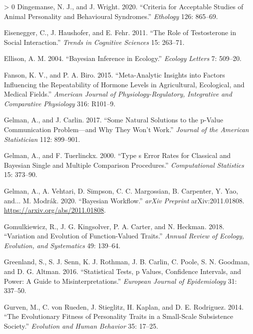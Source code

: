 \documentclass{article}
\newlength{\cslhangindent}
\newenvironment{CSLReferences}[3] %
 {%
  \setlength{\parindent}{0pt}
  \ifodd #1 \everypar{\setlength{\hangindent}{\cslhangindent}}\ignorespaces\fi
  \ifnum #2 > 0
  \setlength{\parskip}{#2\baselineskip}
  \fi
 }%
 {}
\begin{document}
\begin{CSLReferences}{1}{0}
\leavevmode\hypertarget{ref-Ding2020}{}%
Dingemanse, N. J., and J. Wright. 2020. {``Criteria for Acceptable
Studies of Animal Personality and Behavioural Syndromes.''}
\emph{Ethology} 126: 865--69.

\leavevmode\hypertarget{ref-Eis2011}{}%
Eisenegger, C., J. Haushofer, and E. Fehr. 2011. {``The Role of
Testosterone in Social Interaction.''} \emph{Trends in Cognitive
Sciences} 15: 263--71.

\leavevmode\hypertarget{ref-Ellison2004}{}%
Ellison, A. M. 2004. {``Bayesian Inference in Ecology.''} \emph{Ecology
Letters} 7: 509--20.

\leavevmode\hypertarget{ref-Fanson2019}{}%
Fanson, K. V., and P. A. Biro. 2015. {``Meta-Analytic Insights into
Factors Influencing the Repeatability of Hormone Levels in Agricultural,
Ecological, and Medical Fields.''} \emph{American Journal of
Physiology-Regulatory, Integrative and Comparative Physiology} 316:
R101--9.

\leavevmode\hypertarget{ref-Gelman2017}{}%
Gelman, A., and J. Carlin. 2017. {``Some Natural Solutions to the
p-Value Communication Problem---and Why They Won't Work.''}
\emph{Journal of the American Statistician} 112: 899--901.

\leavevmode\hypertarget{ref-Gelman2000}{}%
Gelman, A., and F. Tuerlinckx. 2000. {``Type s Error Rates for Classical
and Bayesian Single and Multiple Comparison Procedures.''}
\emph{Computational Statistics} 15: 373--90.

\leavevmode\hypertarget{ref-Gelman2020}{}%
Gelman, A., A. Vehtari, D. Simpson, C. C. Margossian, B. Carpenter, Y.
Yao, and... M. Modrák. 2020. {``Bayesian Workflow.''} \emph{arXiv
Preprint} arXiv:2011.01808. \url{https://arxiv.org/abs/2011.01808}.

\leavevmode\hypertarget{ref-Gomulk2018}{}%
Gomulkiewicz, R., J. G. Kingsolver, P. A. Carter, and N. Heckman. 2018.
{``Variation and Evolution of Function-Valued Traits.''} \emph{Annual
Review of Ecology, Evolution, and Systematics} 49: 139--64.

\leavevmode\hypertarget{ref-Green2016}{}%
Greenland, S., S. J. Senn, K. J. Rothman, J. B. Carlin, C. Poole, S. N.
Goodman, and D. G. Altman. 2016. {``Statistical Tests, p Values,
Confidence Intervals, and Power: A Guide to Misinterpretations.''}
\emph{European Journal of Epidemiology} 31: 337--50.

\leavevmode\hypertarget{ref-Gurven2014}{}%
Gurven, M., C. von Rueden, J. Stieglitz, H. Kaplan, and D. E. Rodriguez.
2014. {``The Evolutionary Fitness of Personality Traits in a Small-Scale
Subsistence Society.''} \emph{Evolution and Human Behavior} 35: 17--25.


\end{CSLReferences}
\end{document}
